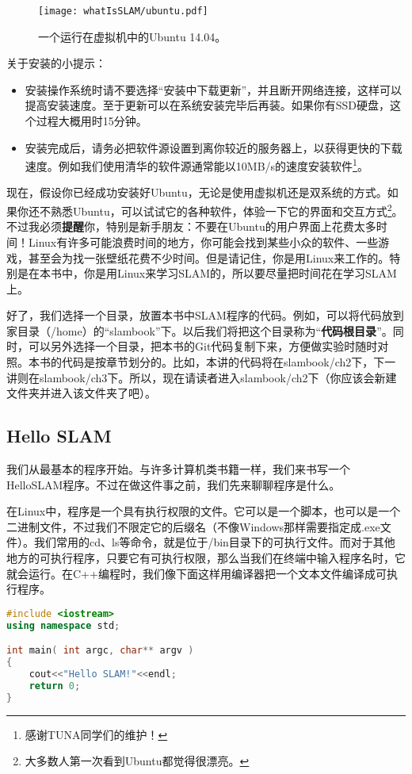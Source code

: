 \begin{figure}[!ht]
	\centering
	\texttt{[image: whatIsSLAM/ubuntu.pdf]}
	\caption{一个运行在虚拟机中的Ubuntu 14.04。}
	\label{fig:ubuntu}
\end{figure}

关于安装的小提示：
\begin{itemize}
	\item 安装操作系统时请不要选择“安装中下载更新”，并且断开网络连接，这样可以提高安装速度。至于更新可以在系统安装完毕后再装。如果你有SSD硬盘，这个过程大概用时15分钟。
	\item 安装完成后，请务必把软件源设置到离你较近的服务器上，以获得更快的下载速度。例如我们使用清华的软件源通常能以10MB/s的速度安装软件\footnote{感谢TUNA同学们的维护！}。
\end{itemize}

现在，假设你已经成功安装好Ubuntu，无论是使用虚拟机还是双系统的方式。如果你还不熟悉Ubuntu，可以试试它的各种软件，体验一下它的界面和交互方式\footnote{大多数人第一次看到Ubuntu都觉得很漂亮。}。不过我必须\textbf{提醒}你，特别是新手朋友：不要在Ubuntu的用户界面上花费太多时间！Linux有许多可能浪费时间的地方，你可能会找到某些小众的软件、一些游戏，甚至会为找一张壁纸花费不少时间。但是请记住，你是用Linux来工作的。特别是在本书中，你是用Linux来学习SLAM的，所以要尽量把时间花在学习SLAM上。

好了，我们选择一个目录，放置本书中SLAM程序的代码。例如，可以将代码放到家目录（/home）的“slambook”下。以后我们将把这个目录称为“\textbf{代码根目录}”。同时，可以另外选择一个目录，把本书的Git代码复制下来，方便做实验时随时对照。本书的代码是按章节划分的。比如，本讲的代码将在slambook/ch2下，下一讲则在slambook/ch3下。所以，现在请读者进入slambook/ch2下（你应该会新建文件夹并进入该文件夹\mbox{了吧）。}

\subsection{Hello SLAM}
我们从最基本的程序开始。与许多计算机类书籍一样，我们来书写一个HelloSLAM程序。不过在做这件事之前，我们先来聊聊程序是什么。

在Linux中，程序是一个具有执行权限的文件。它可以是一个脚本，也可以是一个二进制文件，不过我们不限定它的后缀名（不像Windows那样需要指定成.exe文件）。我们常用的cd、ls等命令，就是位于/bin目录下的可执行文件。而对于其他地方的可执行程序，只要它有可执行权限，那么当我们在终端中输入程序名时，它就会运行。在C++编程时，我们像下面这样用编译器把一个文本文件编译成可执行程序。

\begin{lstlisting}[language=C++,caption=slambook/ch2/helloSLAM.cpp]
#include <iostream>
using namespace std;

int main( int argc, char** argv )
{
	cout<<"Hello SLAM!"<<endl;
	return 0;
}
\end{lstlisting}

